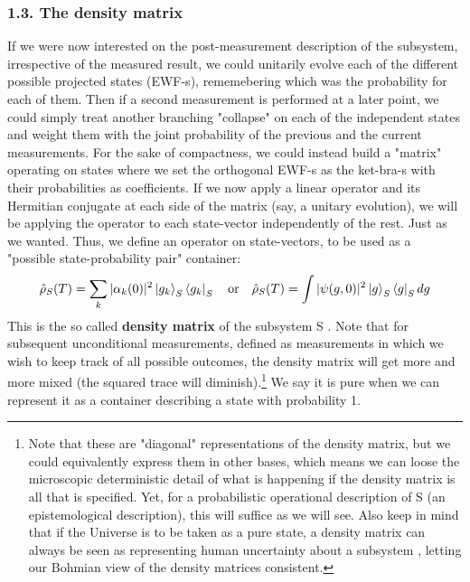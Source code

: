 \documentclass[11pt, a4paper]{article} %
\begin{document}
\subsubsection*{1.3. The density matrix}\vspace{-0.15cm}
If we were now interested on the post-measurement description of the subsystem, irrespective of the measured result, we could unitarily evolve each of the different possible projected states (EWF-s), rememebering which was the probability for each of them. Then if a second measurement is performed at a later point, we could simply treat another branching "collapse" on each of the independent states and weight them with the joint probability of the previous and the current measurements. For the sake of compactness, we could instead build a "matrix" operating on states where we set the orthogonal EWF-s as the ket-bra-s with their probabilities as coefficients. If we now apply a linear operator and its Hermitian conjugate at each side of the matrix (say, a unitary evolution), we will be applying the operator to each state-vector independently of the rest. Just as we wanted. Thus, we define an operator on state-vectors, to be used as a "possible state-probability pair" container:\vspace{-0.1cm}
\begin{equation}\label{dens}
\hat{\rho}_S(T) =\sum_k |\alpha_k(0)|^2\ket{g_k}_S\bra{g_k}_S \quad \text{or} \quad \hat{\rho}_S(T)=\int |\psi(g,0)|^2\ket{g}_S\bra{g}_S dg\vspace{-0.2cm}
\end{equation}
This is the so called {\bf density matrix} of the subsystem S \cite{vonNeumann, Durr, Holland}. Note that for subsequent unconditional measurements, defined as measurements in which we wish to keep track of all possible outcomes, the density matrix will get more and more mixed (the squared trace will diminish).\footnote{Note that these are "diagonal" representations of the density matrix, but we could equivalently express them in other bases, which means we can loose the microscopic deterministic detail of what is happening if the density matrix is all that is specified. Yet, for a probabilistic operational description of S (an epistemological description), this will suffice as we will see. Also keep in mind that if the Universe is to be taken as a pure state, a density matrix can always be seen as representing human uncertainty about a subsystem \cite{Generalized}, letting our Bohmian view of the density matrices consistent.} We say it is pure when we can represent it as a container describing a state with probability 1. \vspace{-0.2cm}
\end{document}
